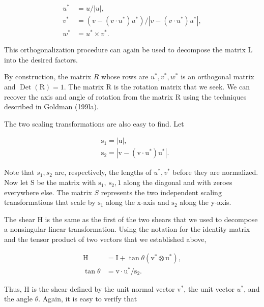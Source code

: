 $$
\begin{aligned}
u^{*} &=u /|u|, \\
v^{*} &=\left(v-\left(v \cdot u^{*}\right) u^{*}\right) /\left|v-\left(v \cdot u^{*}\right) u^{*}\right|, \\
w^{*} &=u^{*} \times v^{*} .
\end{aligned}
$$

This orthogonalization procedure can again be used to decompose the matrix L into the desired factors.

By construction, the matrix $R$ whose rows are $u^{*}, v^{*}, w^{*}$ is an orthogonal matrix and $\operatorname{Det}(\mathrm{R})=1$. The matrix $\mathrm{R}$ is the rotation matrix that we seek. We can recover the axis and angle of rotation from the matrix $\mathrm{R}$ using the techniques described in Goldman (199la).

The two scaling transformations are also easy to find. Let

$$
\begin{aligned}
&\mathrm{s}_{1}=|\mathrm{u}|, \\
&\mathrm{s}_{2}=\left|\mathrm{v}-\left(\mathrm{v} \cdot \mathrm{u}^{*}\right) \mathrm{u}^{*}\right| .
\end{aligned}
$$

Note that $s_{1}, s_{2}$ are, respectively, the lengths of $u^{*}, v^{*}$ before they are normalized. Now let $\mathrm{S}$ be the matrix with $\mathrm{s}_{1}, \mathrm{~s}_{2}, 1$ along the diagonal and with zeroes everywhere else. The matrix $S$ represents the two independent scaling transformations that scale by $\mathrm{s}_{1}$ along the $\mathrm{x}$-axis and $\mathrm{s}_{2}$ along the y-axis.

The shear $\mathrm{H}$ is the same as the first of the two shears that we used to decompose a nonsingular linear transformation. Using the notation for the identity matrix and the tensor product of two vectors that we established above,

$$
\begin{aligned}
\mathrm{H} &=\mathrm{I}+\tan \theta\left(\mathrm{v}^{*} \otimes \mathrm{u}^{*}\right), \\
\tan \theta &=\mathrm{v} \cdot \mathrm{u}^{*} / \mathrm{s}_{2} .
\end{aligned}
$$

Thus, $\mathrm{H}$ is the shear defined by the unit normal vector $\mathrm{v}^{*}$, the unit vector $u^{*}$, and the angle $\theta$. Again, it is easy to verify that

